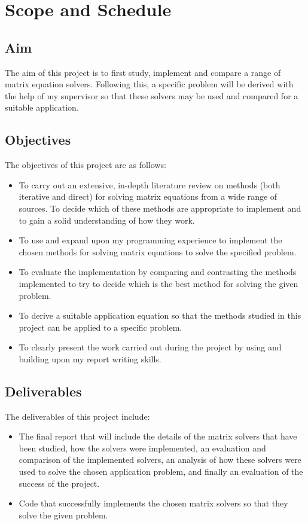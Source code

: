 \documentclass{article}
\numberwithin{equation}{section}
\begin{document}
\newpage

\section{Scope and Schedule}
\subsection{Aim}
The aim of this project is to first study, implement and compare a range of matrix equation solvers. Following this, a specific problem will be derived with the help of my supervisor so that these solvers may be used and compared for a suitable application.

\subsection{Objectives}
The objectives of this project are as follows:
\begin{itemize}
\item To carry out an extensive, in-depth literature review on methods (both iterative and direct) for solving matrix equations from a wide range of sources. To decide which of these methods are appropriate to implement and to gain a solid understanding of how they work. 
\item To use and expand upon my programming experience to implement the chosen methods for solving matrix equations to solve the specified problem. 
\item To evaluate the implementation by comparing and contrasting the methods implemented to try to decide which is the best method for solving the given problem.
\item To derive a suitable application equation so that the methods studied in this project can be applied to a specific problem. 
\item To clearly present the work carried out during the project by using and building upon my report writing skills.
\end{itemize}

\subsection{Deliverables}
The deliverables of this project include:
\begin{itemize}
\item The final report that will include the details of the matrix solvers that have been studied, how the solvers were implemented, an evaluation and comparison of the implemented solvers, an analysis of how these solvers were used to solve the chosen application problem, and finally an evaluation of the success of the project.  
\item Code that successfully implements the chosen matrix solvers so that they solve the given problem.
\end{itemize}
\end{document}
